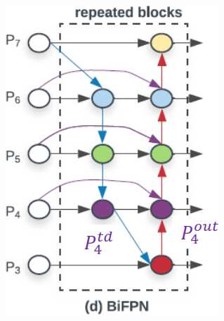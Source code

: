 \begin{subappendices}
\begin{description}
\begin{description}
\begin{itemize}
                            \begin{figure}[H]
                                \centering
                                \includegraphics[width=0.15\linewidth]{./img/bifpn.jpg}
                            \end{figure}
                        \end{itemize}
                \end{description}
        \end{description}
\end{subappendices}